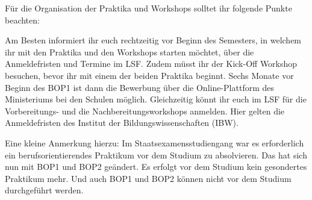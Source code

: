 Für die Organisation der Praktika und Workshops solltet ihr folgende Punkte beachten: 

Am Besten informiert ihr euch rechtzeitig vor Beginn des Semesters, in welchem ihr mit den Praktika und den Workshops starten möchtet, über die Anmeldefristen und Termine im LSF. Zudem müsst ihr der Kick-Off Workshop besuchen, bevor ihr mit einem der beiden Praktika beginnt. Sechs Monate vor Beginn des BOP1 ist dann die Bewerbung über die Online-Plattform des Ministeriums bei den Schulen möglich. Gleichzeitig könnt ihr euch im LSF für die Vorbereitungs- und die Nachbereitungsworkshops anmelden. Hier gelten die Anmeldefristen des  Institut der Bildungswissenschaften (IBW).

Eine kleine Anmerkung hierzu: Im Staatsexamensstudiengang war es erforderlich ein berufsorientierendes Praktikum vor dem Studium zu absolvieren. Das hat sich nun mit BOP1 und BOP2 geändert. Es erfolgt vor dem Studium kein gesondertes Praktikum mehr. Und auch BOP1 und BOP2 können nicht vor dem Studium durchgeführt werden.
